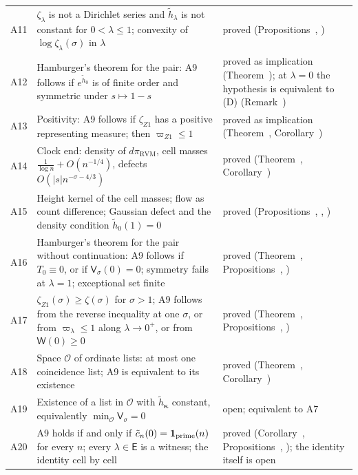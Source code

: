 \documentclass[11pt,reqno]{amsart}
\makeatletter
\let\CG@origref\ref
\let\CG@origeqref\eqref
\newcommand{\CG@gettip}[1]{\@ifundefined{CGTip@#1}{Reference: #1}{\csname CGTip@#1\endcsname}}
\DeclareRobustCommand{\CGref}[1]{\pdftooltip{\CG@origref{#1}}{\CG@gettip{#1}}}
\DeclareRobustCommand{\CGeqref}[1]{\pdftooltip{\CG@origeqref{#1}}{\CG@gettip{#1}}}
\numberwithin{equation}{section}
\theoremstyle{plain}
\theoremstyle{definition}
\theoremstyle{remark}
\newcommand{\RVM}{\mathrm{RVM}}
\makeatother
\begin{document}
\begin{longtable}{p{}p{}p{}}
A11 & $\zeta_\lambda$ is not a Dirichlet series and $\tilde h_\lambda$ is not constant for $0<\lambda\le1$; convexity of $\log\zeta_\lambda(\sigma)$ in $\lambda$ & proved (Propositions~\CGref{prop:nonconstant}, \CGref{prop:convexity})\\
A12 & Hamburger's theorem for the pair: A9 follows if $e^{\tilde h_0}$ is of finite order and symmetric under $s\mapsto1-s$ & proved as implication (Theorem~\CGref{thm:pair-criterion}); at $\lambda=0$ the hypothesis is equivalent to (D) (Remark~\CGref{rem:pair-no-slack})\\
A13 & Positivity: A9 follows if $\zeta_{Z1}$ has a positive representing measure; then $\varpi_{Z1}\le1$ & proved as implication (Theorem~\CGref{thm:positivity}, Corollary~\CGref{cor:positivity})\\
A14 & Clock end: density of $d\pi_{\RVM}$, cell masses $\frac1{\log n}+O(n^{-1/4})$, defects $O(|s|n^{-\sigma-4/3})$ & proved (Theorem~\CGref{thm:clock-density}, Corollary~\CGref{cor:clock-cells})\\
A15 & Height kernel of the cell masses; flow as count difference; Gaussian defect and the density condition $\tilde h_0(1)=0$ & proved (Propositions~\CGref{prop:height-kernels}, \CGref{prop:flow-count}, \CGref{prop:gaussian-defect})\\
A16 & Hamburger's theorem for the pair without continuation: A9 follows if $T_0\equiv0$, or if $\mathsf V_\sigma(0)=0$; symmetry fails at $\lambda=1$; exceptional set finite & proved (Theorem~\CGref{thm:double-hamburger}, Propositions~\CGref{prop:clock-asymmetry}, \CGref{prop:exceptional-set})\\
A17 & $\zeta_{Z1}(\sigma)\ge\zeta(\sigma)$ for $\sigma>1$; A9 follows from the reverse inequality at one $\sigma$, or from $\varpi_\lambda\le1$ along $\lambda\to0^+$, or from $\mathsf W(0)\ge0$ & proved (Theorem~\CGref{thm:real-axis}, Propositions~\CGref{prop:one-number}, \CGref{prop:open-path-varpi})\\
A18 & Space $\mathscr O$ of ordinate lists: at most one coincidence list; A9 is equivalent to its existence & proved (Theorem~\CGref{thm:rigidity}, Corollary~\CGref{cor:existence-form})\\
A19 & Existence of a list in $\mathscr O$ with $\tilde h_{\boldsymbol{\kappa}}$ constant, equivalently $\min_{\mathscr O}\mathsf V_\sigma=0$ & open; equivalent to A7\\
A20 & A9 holds if and only if $\tilde c_n(0)=\mathbf 1_{\rm prime}(n)$ for every $n$; every $\lambda\in\mathsf E$ is a witness; the identity \CGeqref{eq:per-cell} cell by cell & proved (Corollary~\CGref{cor:cell-mass-form}, Propositions~\CGref{prop:witness}, \CGref{prop:per-cell}); the identity \CGeqref{eq:per-cell} itself is open\\

\end{longtable}
\end{document}
